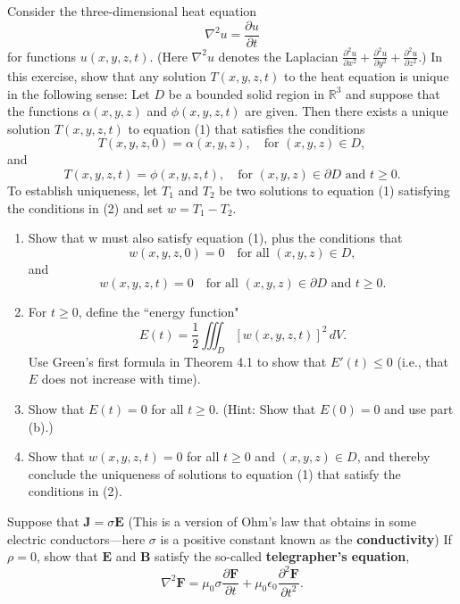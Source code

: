 \documentclass[11pt,letterpaper,boxed]{hmcpset}
\newcommand{\R}{\mathbb{R}}
\newcommand{\pdr}[2]{\frac{\partial #1}{\partial #2}}
\newcommand{\pdrr}[2]{\frac{\partial^2 #1}{\partial #2^2}}
\newcommand{\VEC}[1]{\ensuremath{\mathbf{#1}}\xspace}
\begin{document}
\begin{problem}[Colley 7.4 \#10]
Consider the three-dimensional heat equation
\begin{equation}
\nabla^2u=\pdr{u}{t} \label{eq1}
\end{equation}
for functions $u(x, y, z, t)$. (Here $\nabla^2u$ denotes the
Laplacian $\pdrr{u}{x} + \pdrr{u}{y} + \pdrr{u}{z}$.) In this exercise, show that any solution $T (x, y, z, t)$ to the heat equation is unique in the following sense: Let $D$ be a bounded solid region in $\R^3$ and suppose that the functions $\alpha(x, y, z)$ and $\phi(x, y, z, t)$ are given. Then there exists a unique solution $T (x, y, z, t)$ to equation (1) that satisfies the conditions
\begin{equation}
T(x,y,z,0) = \alpha(x,y,z), \quad \text{for } (x,y,z)\in D, \label{eq2}
\end{equation}
and
\[
	T(x,y,z,t) = \phi(x,y,z,t), \quad \text{for } (x,y,z)\in \partial D \text{ and } t\geq0.
\]
To establish uniqueness, let $T_1$ and $T_2$ be two solutions to equation (1) satisfying the conditions in (2) and set $w = T_1 - T_2$.
\begin{enumerate}
\item Show that w must also satisfy equation (1), plus the conditions that
\[
w(x,y,z,0)=0 \quad \text{for all }(x,y,z) \in D,
\]
and
\[
 w(x,y,z,t)=0 \quad \text{for all }(x,y,z)\in\partial D \text{ and } t \geq0.
\]
\item For $t\geq0$, define the ``energy function"
\[
	E(t)=\frac{1}{2}\iiint_D[w(x,y,z,t)]^2\,dV.
\]
Use Green's first formula in Theorem 4.1 to show that $E'(t) \leq 0$ (i.e., that $E$ does not increase with time). 
\item Show that $E(t) = 0$ for all $t \geq 0$. (Hint: Show that $E(0) = 0$ and use part (b).)
\item Show that $w(x,y,z,t)=0$ for all $t \geq0$ and $(x, y, z) \in D$, and thereby conclude the uniqueness of solutions to equation (1) that satisfy the conditions in (2).
\end{enumerate}
\end{problem}

\begin{solution}
\vfill
\end{solution}
\newpage

\begin{problem}[Colley 7.4 \#18	]
Suppose that $\VEC{J} = \sigma\VEC{E}$ (This is a version of Ohm's law that obtains in some electric conductors---here
$\sigma$ is a positive constant known as the \textbf{conductivity}) If $\rho=0$, show that $\VEC{E}$ and $\VEC{B}$ satisfy the so-called
\textbf{telegrapher's equation},
\[
	\nabla^2\VEC{F} = \mu_0\sigma\pdr{\VEC{F}}{t}+\mu_0\epsilon_0\pdrr{\VEC{F}}{t}.
\]
\end{problem}
\end{document}
